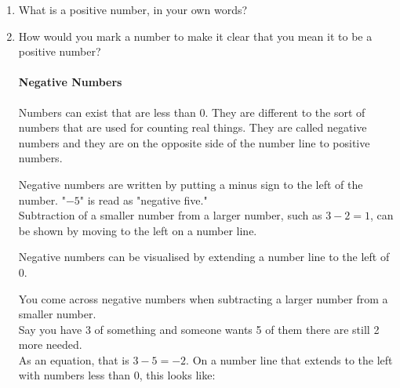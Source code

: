 \documentclass{article}
\begin{document}
\begin{enumerate}
\item What is a positive number, in your own words?
\item How would you mark a number to make it clear that you mean it to be a positive number?

\paragraph{Negative Numbers}
Numbers can exist that are less than 0. They are different to the sort of numbers that are used for counting real things. They are called negative numbers and they are on the opposite side of the number line to positive numbers.

Negative numbers are written by putting a minus sign to the left of the number. "$-5$" is read as "negative five."\\

Subtraction of a smaller number from a larger number, such as $3-2=1$, can be shown by moving to the left on a number line.\\


Negative numbers can be visualised by extending a number line to the left of 0.\\

\begin{center}
\end{center}

You come across negative numbers when subtracting a larger number from a smaller number.\\

Say you have 3 of something  and someone wants 5 of them  there are still 2 more needed. \\

As an equation, that is $3-5=-2$. On a number line that extends to the left with numbers less than 0, this looks like:


\end{enumerate}
\end{document}
